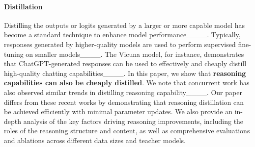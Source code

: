 
\paragraph{Distillation}
Distilling the outputs or logits generated by a larger or more capable model has become a standard technique to enhance model performance____.  Typically, responses generated by higher-quality models are used to perform supervised fine-tuning on smaller models____. 
The Vicuna model, for instance, demonstrates that ChatGPT-generated responses can be used to effectively and cheaply distill high-quality chatting capabilities____. In this paper, we show that \textbf{reasoning capabilities can also be cheaply distilled}. We note that concurrent work has also observed similar trends in distilling reasoning capability____. 
Our paper differs from these recent works by demonstrating that reasoning distillation can be achieved efficiently with minimal parameter updates. We also provide an in-depth analysis of the key factors driving reasoning improvements, including the roles of the reasoning structure and content, as well as comprehensive evaluations and ablations across different data sizes and teacher models.

